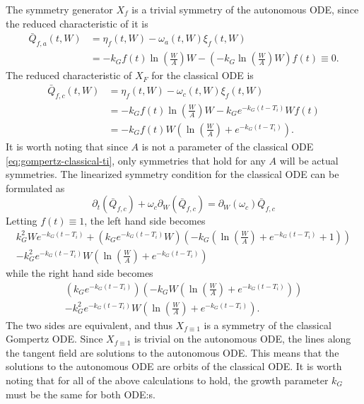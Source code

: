 The symmetry generator \(X_f\) is a trivial symmetry of the autonomous ODE, since the reduced characteristic of it is
\begin{align}
  \bar{Q}_{f,a}(t, W) &= \eta_f(t, W) - \omega_a(t, W) \xi_f(t, W)\\
  &= - k_G f(t) \ln(\frac{W}{A}) W - \left(-k_G \ln(\frac{W}{A}) W \right) f(t) \equiv 0.
\end{align}
The reduced characteristic of \(X_F\) for the classical ODE is
\begin{align}
  \bar{Q}_{f,c}(t, W) &= \eta_f(t, W) - \omega_c(t, W) \xi_f(t, W)\\
  &= - k_G f(t) \ln(\frac{W}{A}) W - k_G e^{-k_G (t - T_i)} W f(t)\\
  &= - k_G f(t) W \left(\ln(\frac{W}{A}) + e^{-k_G (t - T_i)}\right).
\end{align}
It is worth noting that since \(A\) is not a parameter of the classical ODE \ref{eq:gompertz-classical-ti}, only symmetries that hold for any \(A\) will be actual symmetries.
The linearized symmetry condition for the classical ODE can be formulated as
\begin{equation}
  \partial_t(\bar{Q}_{f,c}) + \omega_c \partial_W(\bar{Q}_{f,c}) = \partial_W(\omega_c) \bar{Q}_{f,c}
\end{equation}
Letting \(f(t) \equiv 1\), the left hand side becomes
\begin{gather}
  k_G^2 W e^{-k_G (t - T_i)} + \left(k_G e^{-k_G (t - T_i)} W\right) \left(-k_G \left(\ln(\frac{W}{A}) + e^{-k_G (t - T_i)} + 1\right)\right)\\
  -k_G^2 e^{-k_G (t - T_i)} W\left(\ln(\frac{W}{A}) + e^{-k_G (t - T_i)}\right)
\end{gather}
while the right hand side becomes
\begin{gather}
  \left(k_G e^{-k_G (t - T_i)}\right) \left(- k_G W \left(\ln(\frac{W}{A}) + e^{-k_G (t - T_i)}\right)\right)\\
  -k_G^2 e^{-k_G (t - T_i)} W \left(\ln(\frac{W}{A}) + e^{-k_G (t - T_i)}\right).
\end{gather}
The two sides are equivalent, and thus \(X_{f\equiv1}\) is a symmetry of the classical Gompertz ODE.
Since \(X_{f\equiv1}\) is trivial on the autonomous ODE, the lines along the tangent field are solutions to the autonomous ODE.
This means that the solutions to the autonomous ODE are orbits of the classical ODE.
It is worth noting that for all of the above calculations to hold, the growth parameter \(k_G\) must be the same for both ODE:s.


